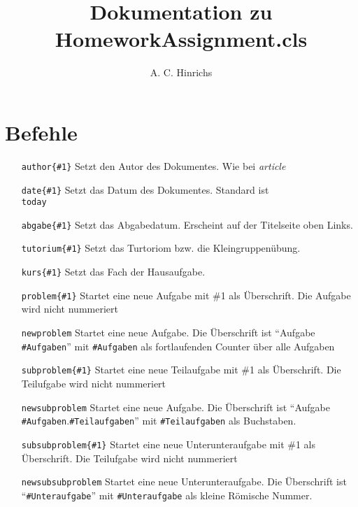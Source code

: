 \documentclass[a4papr]{article}
\title{Dokumentation zu HomeworkAssignment.cls}
\author{A. C. Hinrichs}
\begin{document}
\maketitle
\section{Befehle}
\begin{itemize}
 \item[\texttt{author\{\#1\}}]		Setzt den Autor des Dokumentes. Wie bei \textit{article}
 \item[\texttt{date\{\#1\}}]		Setzt das Datum des Dokumentes. Standard ist \texttt{\\today}
 \item[\texttt{abgabe\{\#1\}}]		Setzt das Abgabedatum. Erscheint auf der Titelseite oben Links.
 \item[\texttt{tutorium\{\#1\}}]	Setzt das Turtoriom bzw. die Kleingruppen\"ubung.	
 \item[\texttt{kurs\{\#1\}}]		Setzt das Fach der Hausaufgabe.	
 \item[\texttt{problem\{\#1\}}] 	Startet eine neue Aufgabe mit \#1 als \"Uberschrift.  Die Aufgabe wird nicht nummeriert
 \item[\texttt{newproblem}] 		Startet eine neue Aufgabe. Die \"Uberschrift ist \enquote{Aufgabe \texttt{\#Aufgaben}} mit \texttt{\#Aufgaben} als fortlaufenden Counter \"uber alle Aufgaben
 \item[\texttt{subproblem\{\#1\}}] 	Startet eine neue Teilaufgabe mit \#1 als \"Uberschrift.  Die Teilufgabe wird nicht nummeriert
 \item[\texttt{newsubproblem}] 		Startet eine neue Aufgabe. Die \"Uberschrift ist \enquote{Aufgabe \texttt{\#Aufgaben}.\texttt{\#Teilaufgaben}} mit \texttt{\#Teilaufgaben} als Buchstaben.
 \item[\texttt{subsubproblem\{\#1\}}] 	Startet eine neue Unterunteraufgabe mit \#1 als \"Uberschrift.  Die Teilufgabe wird nicht nummeriert
 \item[\texttt{newsubsubproblem}] 	Startet eine neue Unterunteraufgabe. Die \"Uberschrift ist \enquote{\texttt{\#Unteraufgabe}} mit \texttt{\#Unteraufgabe} als kleine R\"omische Nummer.
\end{itemize}
\end{document}
